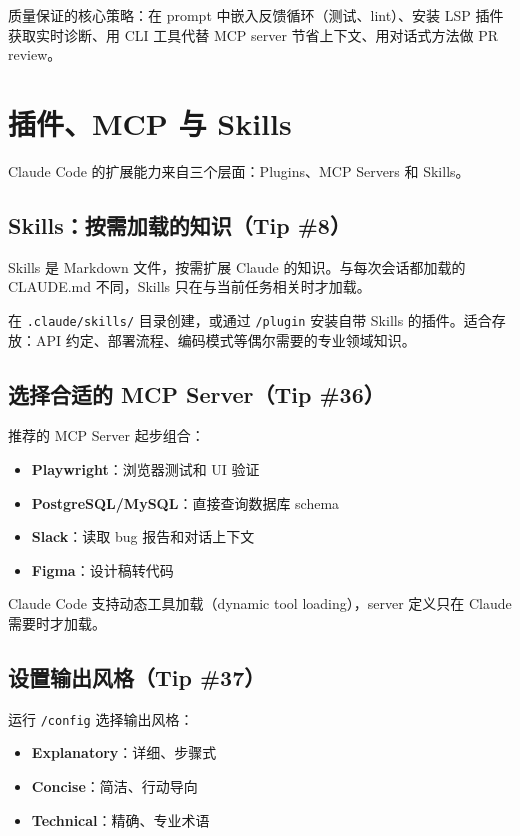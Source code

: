 \documentclass[a4paper]{article}
\begin{document}
质量保证的核心策略：在 prompt 中嵌入反馈循环（测试、lint）、安装 LSP 插件获取实时诊断、用 CLI 工具代替 MCP server 节省上下文、用对话式方法做 PR review。

\section{插件、MCP 与 Skills}

Claude Code 的扩展能力来自三个层面：Plugins、MCP Servers 和 Skills。

\subsection{Skills：按需加载的知识（Tip \#8）}

Skills 是 Markdown 文件，按需扩展 Claude 的知识。与每次会话都加载的 CLAUDE.md 不同，Skills 只在与当前任务相关时才加载。

在 \texttt{.claude/skills/} 目录创建，或通过 \texttt{/plugin} 安装自带 Skills 的插件。适合存放：API 约定、部署流程、编码模式等偶尔需要的专业领域知识。

\subsection{选择合适的 MCP Server（Tip \#36）}

推荐的 MCP Server 起步组合：
\begin{itemize}
  \item \textbf{Playwright}：浏览器测试和 UI 验证
  \item \textbf{PostgreSQL/MySQL}：直接查询数据库 schema
  \item \textbf{Slack}：读取 bug 报告和对话上下文
  \item \textbf{Figma}：设计稿转代码
\end{itemize}

Claude Code 支持动态工具加载（dynamic tool loading），server 定义只在 Claude 需要时才加载。

\subsection{设置输出风格（Tip \#37）}

运行 \texttt{/config} 选择输出风格：
\begin{itemize}
  \item \textbf{Explanatory}：详细、步骤式
  \item \textbf{Concise}：简洁、行动导向
  \item \textbf{Technical}：精确、专业术语
\end{itemize}
\end{document}
